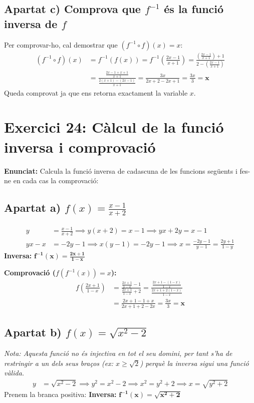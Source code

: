 \documentclass[12pt,a4paper]{article}
\begin{document}
\subsection{Apartat c) Comprova que $f^{-1}$ és la funció inversa de $f$}

Per comprovar-ho, cal demostrar que $(f^{-1} \circ f)(x) = x$:
\begin{align*}
(f^{-1} \circ f)(x) &= f^{-1}(f(x)) = f^{-1}\left(\frac{2x - 1}{x + 1}\right) = \frac{\left(\frac{2x - 1}{x + 1}\right) + 1}{2 - \left(\frac{2x - 1}{x + 1}\right)} \\
&= \frac{\frac{2x - 1 + x + 1}{x + 1}}{\frac{2(x + 1) - (2x - 1)}{x + 1}} = \frac{3x}{2x + 2 - 2x + 1} = \frac{3x}{3} = \mathbf{x}
\end{align*}
Queda comprovat ja que ens retorna exactament la variable $x$.

\newpage

\section{Exercici 24: Càlcul de la funció inversa i comprovació}

\textbf{Enunciat:} Calcula la funció inversa de cadascuna de les funcions següents i fes-ne en cada cas la comprovació:

\subsection{Apartat a) $f(x) = \frac{x - 1}{x + 2}$}
\begin{align*}
y &= \frac{x - 1}{x + 2} \implies y(x + 2) = x - 1 \implies yx + 2y = x - 1 \\
yx - x &= -2y - 1 \implies x(y - 1) = -2y - 1 \implies x = \frac{-2y - 1}{y - 1} = \frac{2y + 1}{1 - y}
\end{align*}
\textbf{Inversa:} $\mathbf{f^{-1}(x) = \frac{2x + 1}{1 - x}}$

\textbf{Comprovació ($f(f^{-1}(x)) = x$):}
\begin{align*}
f\left(\frac{2x + 1}{1 - x}\right) &= \frac{\frac{2x + 1}{1 - x} - 1}{\frac{2x + 1}{1 - x} + 2} = \frac{\frac{2x + 1 - (1 - x)}{1 - x}}{\frac{2x + 1 + 2(1 - x)}{1 - x}} \\
&= \frac{2x + 1 - 1 + x}{2x + 1 + 2 - 2x} = \frac{3x}{3} = \mathbf{x}
\end{align*}

\subsection{Apartat b) $f(x) = \sqrt{x^2 - 2}$}
\textit{Nota: Aquesta funció no és injectiva en tot el seu domini, per tant s'ha de restringir a un dels seus braços (ex: $x \ge \sqrt{2}$) perquè la inversa sigui una funció vàlida.}
\begin{align*}
y &= \sqrt{x^2 - 2} \implies y^2 = x^2 - 2 \implies x^2 = y^2 + 2 \implies x = \sqrt{y^2 + 2}
\end{align*}
Prenem la branca positiva: \textbf{Inversa:} $\mathbf{f^{-1}(x) = \sqrt{x^2 + 2}}$
\end{document}
